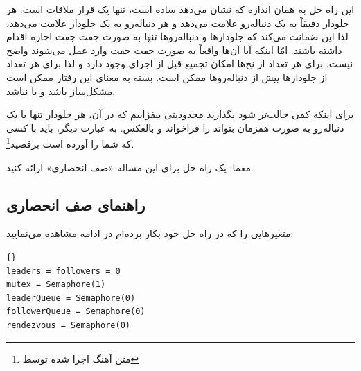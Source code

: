 \documentclass{book}
\newcommand{\clearemptydoublepage}{\newpage\cleardoublepage}
\begin{document}
    این راه حل به همان اندازه که نشان می‌دهد ساده‌ است، تنها یک قرار ملاقات است. 
    هر جلودار دقیقاً به یک دنباله‌رو علامت می‌دهد و هر دنباله‌رو به یک جلودار علامت می‌دهد، لذا این ضمانت می‌کند که جلو‌دارها و دنباله‌روها تنها 
    به صورت جفت جفت اجازه اقدام داشته باشند.  امّا اینکه آیا آ‌ن‌ها واقعاً به صورت جفت جفت وارد عمل می‌شوند واضح نیست. 
    برای هر تعداد از نخ‌ها امکان تجمیع قبل از اجرای  وجود دارد و لذا برای هر تعداد از جلودارها 
    پیش از دنباله‌روها ممکن است. 
    بسته به معنای  این رفتار ممکن است مشکل‌ساز باشد و یا نباشد. 

    برای اینکه کمی جالب‌تر شود بگذارید محدودیتی بیفزاییم که در آن، هر جلودار تنها با یک دنباله‌رو به صورت همزمان بتواند  را 
    فراخواند و بالعکس. به عبارت دیگر، باید با کسی که شما را آورده است برقصید\footnote{متن آهنگ اجرا شده توسط }. 

    معما: یک راه حل برای این مساله «صف انحصاری» ارائه کنید.

\clearemptydoublepage
\subsection {راهنمای صف انحصاری}

    متغیرهایی را که در راه حل خود بکار برده‌ام در ادامه مشاهده می‌نمایید:

\begin{latin}
\begin{latin}
\begin{lstlisting}[title={\rl{راهنمای صف}}]{}
leaders = followers = 0
mutex = Semaphore(1)
leaderQueue = Semaphore(0)
followerQueue = Semaphore(0)
rendezvous = Semaphore(0)
\end{lstlisting}
\end{latin}
\end{latin}
\end{document}
